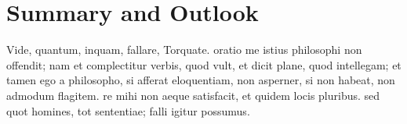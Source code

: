 \cleardoublepage
{}


\chapter{Summary and Outlook}
Vide, quantum, inquam, fallare, Torquate. oratio me istius philosophi non offendit; nam et complectitur verbis, quod vult, et dicit plane, quod intellegam; et tamen ego a philosopho, si afferat eloquentiam, non asperner, si non habeat, non admodum flagitem. re mihi non aeque satisfacit, et quidem locis pluribus. sed quot homines, tot sententiae; falli igitur possumus.